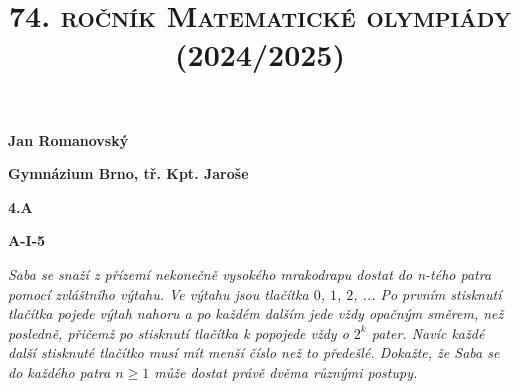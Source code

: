 \documentclass{article}
\title{\normalsize{\vspace{-2cm}\textsc{74. ročník Matematické olympiády (2024/2025)}\vspace{-1.7cm}}}
\date{}
\author{}
\begin{document}
\maketitle

\textbf{ }

\noindent \textbf{Jan Romanovský}

\noindent \textbf{Gymnázium Brno, tř. Kpt. Jaroše}

\noindent \textbf{4.A}

\noindent \textbf{A-\textrm{I}-5}

\textbf{ }

\textit{Saba se snaží z přízemí nekonečně vysokého mrakodrapu dostat do n-tého patra pomocí zvláštního výtahu. Ve výtahu jsou tlačítka $0$, $1$, $2$, ... Po prvním stisknutí tlačítka pojede výtah nahoru a po každém dalším jede vždy opačným směrem, než posledně, přičemž po stisknutí tlačítka k popojede vždy o $2^k$ pater. Navíc každé další stisknuté tlačítko musí mít menší číslo než to předešlé. Dokažte, že Saba se do každého patra $n \geq 1$ může dostat právě dvěma různými postupy.}
\end{document}
